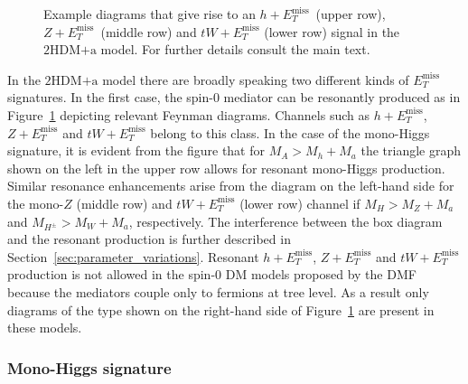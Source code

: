 \documentclass[a4paper, 11pt,notoc]{article}
\newcommand{\MET}{\ensuremath{E_T^\mathrm{miss}}\xspace}
\newcommand{\hdma}{\ensuremath{\textrm{2HDM+a}}\xspace}
\begin{document}
\begin{figure}[t!]
\vspace{4mm}
\caption{\label{fig:resonant} Example diagrams that give rise to an $h+\MET$~(upper row), $Z+\MET$~(middle row) and $tW + \MET$ (lower row) signal in the \hdma model. For further details consult the main text. }
\end{figure}

In the \hdma model there are broadly speaking two different kinds of $\MET$ signatures. In the first case, the spin-0 mediator can be resonantly produced as in Figure~\ref{fig:resonant} depicting relevant Feynman diagrams. Channels such as $h+\MET$, $Z+ \MET$ and $tW+\MET$ belong to this class. In the case of the mono-Higgs signature, it is evident from the figure that for $M_A > M_h + M_a$ the triangle  graph shown on the left in the upper row  allows for resonant mono-Higgs production.  Similar resonance enhancements arise from the diagram on the left-hand side for the mono-$Z$ (middle row) and $tW+\MET$ (lower row) channel if $M_H > M_Z + M_a$ and $M_{H^\pm} > M_W + M_a$, respectively. The interference between the box diagram and the resonant production is further described in Section~\ref{sec:parameter_variations}. Resonant $h+\MET$, $Z+\MET$ and $tW+\MET$ production is not allowed in the spin-0 DM models proposed by the DMF because the mediators couple only to fermions at tree level. As a result only diagrams of the type shown on the right-hand side of Figure~\ref{fig:resonant} are present in these models. 

\subsubsection{Mono-Higgs signature}
\end{document}
